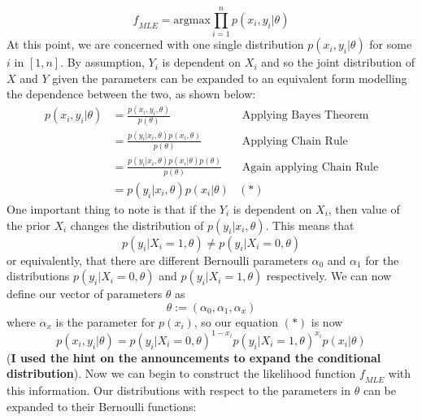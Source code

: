 \documentclass{report}
\theoremstyle{definition}
\begin{document}
\begin{equation*}
    \mathit{f}_{MLE} = \text{argmax}\prod_{i = 1}^{n}p(x_i, y_i|\theta)
\end{equation*}
At this point, we are concerned with one single distribution $p(x_i, y_i|\theta)$ for some $i \text{ in } [1, n]$. By assumption, $Y_i$
is dependent on $X_i$ and so the joint distribution of $X$ and $Y$ given the parameters can be $\text{expanded}$ to an equivalent form
modelling the dependence between the two, as shown below:
\begin{equation*}
    \begin{aligned}
        p(x_i, y_i|\theta)  &= \frac{p(x_i, y_i, \theta)}{p(\theta)}&\text{ Applying Bayes Theorem}\\
                            &= \frac{p(y_i|x_i, \theta)p(x_i, \theta)}{p(\theta)}&\text{ Applying Chain Rule}\\
                            &= \frac{p(y_i|x_i, \theta)p(x_i|\theta)p(\theta)}{p(\theta)}&\text{ Again applying Chain Rule}\\
                            &= p(y_i|x_i, \theta)p(x_i|\theta) & (*)
    \end{aligned}
\end{equation*}
One important thing to note is that if the $Y_i$ is dependent on $X_i$, then value of the prior $X_i$ changes the distribution of
$p(y_i | x_i, \theta)$. This means that 
\begin{equation*}
    p(y_i|X_i = 1, \theta) \neq p(y_i|X_i = 0, \theta)
\end{equation*}
or equivalently, that there are different Bernoulli parameters $\alpha_0$ and $\alpha_1$ for the distributions $p(y_i|X_i = 0, \theta)$ and
$p(y_i|X_i = 1, \theta)$ respectively. We can now define our vector of parameters $\theta$ as
\begin{equation*}
    \theta:=(\alpha_0, \alpha_1, \alpha_x)
\end{equation*}
where $\alpha_x$ is the parameter for $p(x_i)$, so our equation $(*)$ is now 
\begin{equation*}
        p(x_i, y_i|\theta) = p(y_i|X_i = 0, \theta)^{1-x_i}p(y_i|X_i = 1, \theta)^{x_i}p(x_i|\theta)
\end{equation*}
(\textbf{I used the hint on the announcements to expand the conditional distribution}). Now we can begin to construct the likelihood function $\mathit{f}_{MLE}$ with this information.
Our distributions with respect to the parameters in $\theta$ can be $\text{expanded}$ to their Bernoulli functions:
\end{document}
